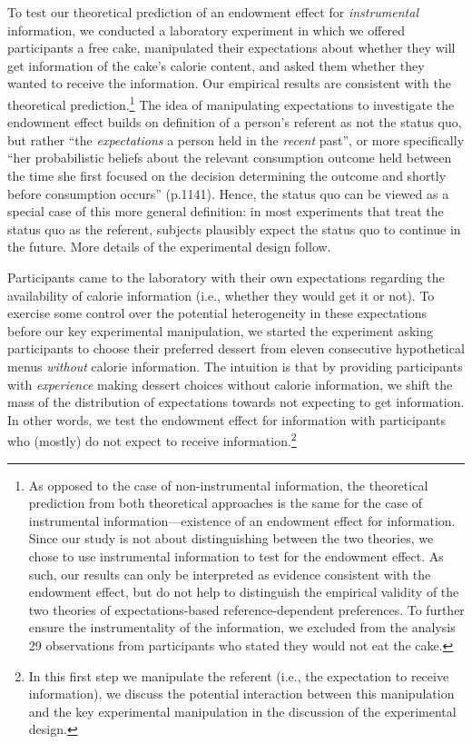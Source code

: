 

To test our theoretical prediction of an endowment effect for \emph{instrumental} information, we conducted a laboratory experiment in which we offered participants a free cake, manipulated their expectations about whether they will get information of the cake’s calorie content, and asked them whether they wanted to receive the information. Our empirical results are consistent with the theoretical prediction.\footnote{As opposed to the case of non-instrumental information, the theoretical prediction from both theoretical approaches is the same for the case of instrumental information---existence of an endowment effect for information. Since our study is not about distinguishing between the two theories, we chose to use instrumental information to test for the endowment effect. As such, our results can only be interpreted as evidence consistent with the endowment effect, but do not help to distinguish the empirical validity of the two theories of expectations-based reference-dependent preferences. To further ensure the instrumentality of the information, we excluded from the analysis 29 observations from participants who stated they would not eat the cake.} The idea of manipulating expectations to investigate the endowment effect builds on  definition of a person’s referent as not the status quo, but rather \enquote{the \emph{expectations} a person held in the \emph{recent} past}, or more specifically \enquote{her probabilistic beliefs about the relevant consumption outcome held between the time she first focused on the decision determining the outcome and shortly before consumption occurs} (p.1141). Hence, the status quo can be viewed as a special case of this more general definition: in most experiments that treat the status quo as the referent, subjects plausibly expect the status quo to continue in the future. More details of the experimental design follow.


Participants came to the laboratory with their own expectations regarding the availability of calorie information (i.e., whether they would get it or not).  To exercise some control over the potential heterogeneity in these expectations before our key experimental manipulation, we started the experiment asking participants to choose their preferred dessert from eleven consecutive hypothetical menus \emph{without} calorie information. The intuition is that by providing participants with \emph{experience} making dessert choices without calorie information, we shift the mass of the distribution of expectations towards not expecting to get information. In other words, we test the endowment effect for information with participants who (mostly) do not expect to receive information.\footnote{In this first step we manipulate the referent (i.e., the expectation to receive information), we discuss the potential interaction between this manipulation and the key experimental manipulation in the discussion of the experimental design.}

